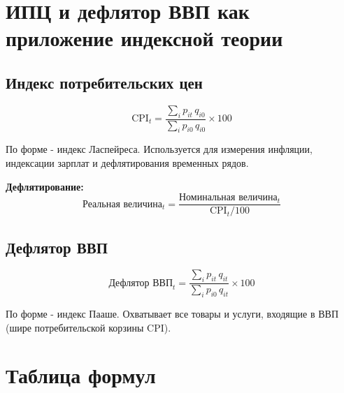 \documentclass[a4paper]{article}
\begin{document}
\section{ИПЦ и дефлятор ВВП как приложение индексной теории}

\subsection{Индекс потребительских цен}

\begin{equation}
	\text{CPI}_t = \frac{\displaystyle\sum_i p_{it}\, q_{i0}}
	{\displaystyle\sum_i p_{i0}\, q_{i0}} \times 100
\end{equation}

По форме - индекс Ласпейреса. Используется для измерения инфляции,
индексации зарплат и дефлятирования временных рядов.

\noindent\textbf{Дефлятирование:}
\begin{equation}
	\text{Реальная величина}_t = \frac{\text{Номинальная величина}_t}{\text{CPI}_t / 100}
\end{equation}

\subsection{Дефлятор ВВП}

\begin{equation}
	\text{Дефлятор ВВП}_t
	= \frac{\displaystyle\sum_i p_{it}\, q_{it}}{\displaystyle\sum_i p_{i0}\, q_{it}} \times 100
\end{equation}

По форме - индекс Пааше. Охватывает все товары и услуги, входящие в ВВП
(шире потребительской корзины CPI).

\section{Таблица формул}
\end{document}

